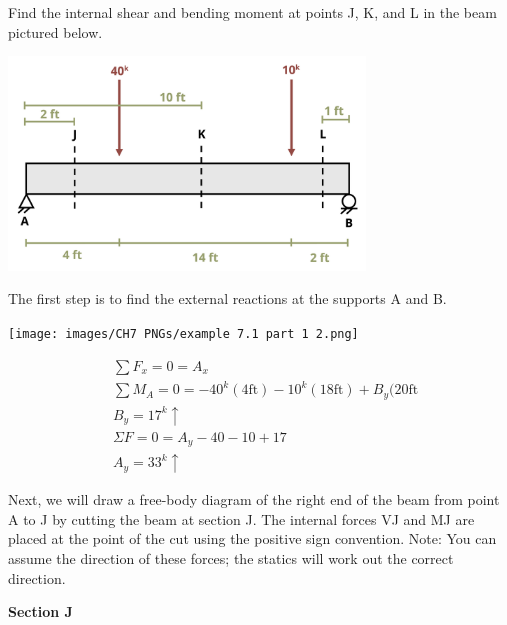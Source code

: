 \documentclass[
  letterpaper,
  DIV=11,
  numbers=noendperiod]{scrreprt}
\begin{document}
\begin{tcolorbox}[enhanced jigsaw, colbacktitle=quarto-callout-note-color!10!white, title={Example 7.1 Simple internal shear and moment problem}, coltitle=black, leftrule=.75mm, rightrule=.15mm, opacityback=0, breakable, colframe=quarto-callout-note-color-frame, left=2mm, arc=.35mm, colback=white, bottomrule=.15mm, bottomtitle=1mm, toptitle=1mm, titlerule=0mm, opacitybacktitle=0.6, toprule=.15mm]

Find the internal shear and bending moment at points J, K, and L in the
beam pictured below.

\begin{center}
\includegraphics[width=3.72917in,height=\textheight]{images/CH7 PNGs/example 7.1 part 1.png}
\end{center}

The first step is to find the external reactions at the supports A and
B.

\begin{center}
\texttt{[image: images/CH7 PNGs/example 7.1 part 1 2.png]}
\end{center}

\[
\begin{aligned}
& \sum F_x=0=A_x \\
& \sum M_A=0=-40^k(4\mathrm{ft})-10^k(18\mathrm{ft})+B_y(20 \mathrm{ft} \\
& B_y=17^k \uparrow \\
& \Sigma F=0=A_y-40-10+17 \\
& A_y=33^k \uparrow
\end{aligned}
\]

Next, we will draw a free-body diagram of the right end of the beam from
point A to J by cutting the beam at section J. The internal forces VJ
and MJ are placed at the point of the cut using the positive sign
convention. Note: You can assume the direction of these forces; the
statics will work out the correct direction.

\textbf{Section J}


\end{tcolorbox}
\end{document}
